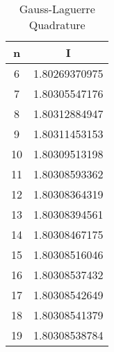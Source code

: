 \begin{table}[h]
\centering
\begin{tabular}{cc}
\hline\hline
n & I \\
\hline
6 & 1.80269370975 \\
7 & 1.80305547176 \\
8 & 1.80312884947 \\
9 & 1.80311453153 \\
10 & 1.80309513198 \\
11 & 1.80308593362 \\
12 & 1.80308364319 \\
13 & 1.80308394561 \\
14 & 1.80308467175 \\
15 & 1.80308516046 \\
16 & 1.80308537432 \\
17 & 1.80308542649 \\
18 & 1.80308541379 \\
19 & 1.80308538784 \\
\hline\hline
\end{tabular}
\label{tb2}
\caption{Gauss-Laguerre Quadrature}
\end{table}
